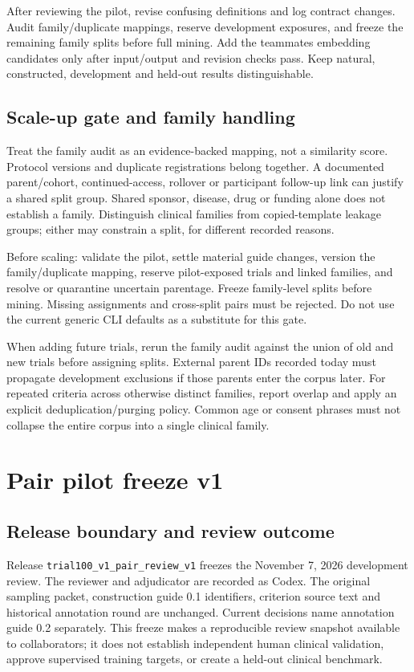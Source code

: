 \documentclass[10pt,letterpaper]{article}
\newcommand{\pathcode}[1]{\nolinkurl{#1}}
\begin{document}
After reviewing the pilot, revise confusing definitions and log contract changes. Audit family/duplicate mappings, reserve development exposures, and freeze the remaining family splits before full mining. Add the teammate\textquotesingle s embedding candidates only after input/output and revision checks pass. Keep natural, constructed, development and held-out results distinguishable.

\subsection{Scale-up gate and family handling}\label{contract02-scale-up-gate-and-family-handling}

Treat the family audit as an evidence-backed mapping, not a similarity score. Protocol versions and duplicate registrations belong together. A documented parent/cohort, continued-access, rollover or participant follow-up link can justify a shared split group. Shared sponsor, disease, drug or funding alone does not establish a family. Distinguish clinical families from copied-template leakage groups; either may constrain a split, for different recorded reasons.

Before scaling: validate the pilot, settle material guide changes, version the family/duplicate mapping, reserve pilot-exposed trials and linked families, and resolve or quarantine uncertain parentage. Freeze family-level splits before mining. Missing assignments and cross-split pairs must be rejected. Do not use the current generic CLI defaults as a substitute for this gate.

When adding future trials, rerun the family audit against the union of old and new trials before assigning splits. External parent IDs recorded today must propagate development exclusions if those parents enter the corpus later. For repeated criteria across otherwise distinct families, report overlap and apply an explicit deduplication/purging policy. Common age or consent phrases must not collapse the entire corpus into a single clinical family.

\section{Pair pilot freeze v1}\label{sec:pairfreeze}

\subsection{Release boundary and review outcome}
Release \pathcode{trial100_v1_pair_review_v1} freezes the November 7, 2026
development review. The reviewer and adjudicator are recorded as Codex.
The original sampling packet, construction guide 0.1 identifiers, criterion
source text and historical annotation round are unchanged. Current decisions
name annotation guide 0.2 separately. This freeze makes a reproducible review
snapshot available to collaborators; it does not establish independent human
clinical validation, approve supervised training targets, or create a held-out
clinical benchmark.
\end{document}
